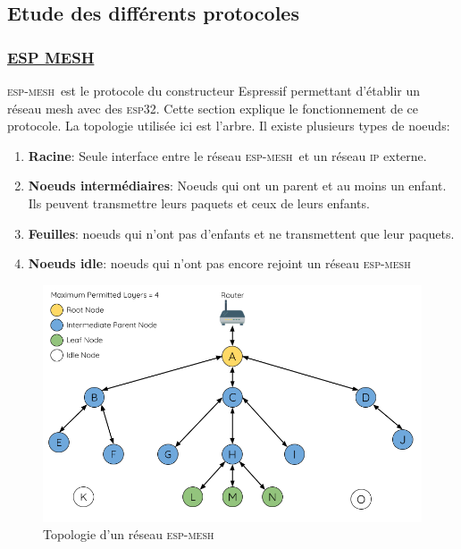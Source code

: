 \documentclass[a4paper, 12pt]{report}
\newcommand{\esp}{\textsc{esp32}}
\newcommand{\espmesh}{\textsc{esp-mesh}}
\begin{document}
    \subsection{Etude des différents protocoles}
    \subsubsection{\underline{ESP MESH}}%
        \espmesh\ est le protocole du constructeur Espressif permettant d'établir un réseau mesh avec des \esp.
        Cette section explique le fonctionnement de ce protocole. La topologie utilisée ici est l'arbre.
        Il existe plusieurs types de noeuds:
        \begin{enumerate}
            \item \textbf{Racine}: Seule interface entre le réseau \espmesh\ et un réseau \textsc{ip} externe.
            \item \textbf{Noeuds intermédiaires}: Noeuds qui ont un parent et au moins un enfant.
            Ils peuvent transmettre leurs paquets et ceux de leurs enfants.
            \item \textbf{Feuilles}: noeuds qui n'ont pas d'enfants et ne transmettent que leur paquets.
            \item \textbf{Noeuds idle}: noeuds qui n'ont pas encore rejoint un réseau \espmesh\ 
        \end{enumerate}

        \begin{figure}[H]
            \centering
            \includegraphics[scale=0.3]{images/mesh-node-types.png}
            \caption{Topologie d'un réseau \espmesh \cite{esp-mesh_w}}
        \end{figure}
\end{document}
